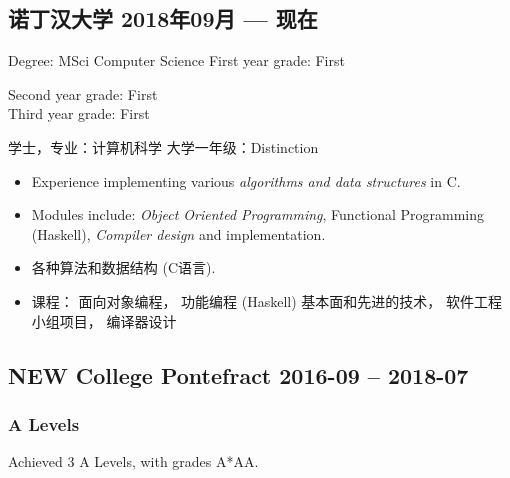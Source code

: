 \documentclass[cv_en.tex]{subfiles}
\begin{document}
\begin{xcn}
        \subsection{诺丁汉大学
        \hfill 2018年09月 --- 现在}
\end{xcn}
\begin{xen}
        Degree: MSci Computer Science
        \hfill
        First year grade: First\\
        {\raggedleft Second year grade: First\\
        Third year grade: First\par}
\end{xen}
\begin{xcn}
        学士，专业：计算机科学
        \hfill
        大学一年级：Distinction\\
        {}
\end{xcn}
\begin{xen}
        \begin{itemize}
            \item Experience implementing various \emph{algorithms and data
                structures} in C.
            \item Modules include: \emph{Object Oriented Programming},
                Functional Programming (Haskell), \emph{Compiler design} and
                implementation.
        \end{itemize}
\end{xen}
\begin{xcn}
        \begin{itemize}
            \item 各种算法和数据结构 (C语言).
            \item 课程：
面向对象编程，
功能编程 (Haskell) \textendash{} 基本面和先进的技术，
软件工程小组项目，
编译器设计
        \end{itemize}
\end{xcn}
\begin{xen}
    \subsection{NEW College Pontefract
        \hfill 2016-09 -- 2018-07}
        \subsubsection{A Levels}
            Achieved 3 A Levels, with grades A*AA.
\end{xen}
\end{document}
